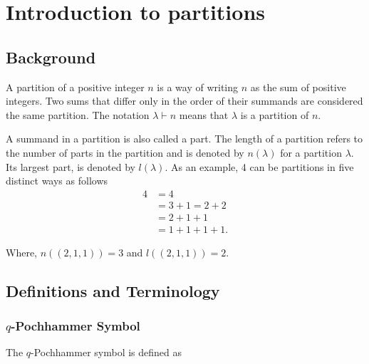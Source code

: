 \chapter{Introduction to partitions}



\section{Background}

A partition of a positive integer $n$ is a way of writing $n$ as the sum of positive integers. Two sums that differ only in the order of their summands are considered the same partition. The notation $\lambda \vdash n$ means that $\lambda$ is a partition of $n$. 

A summand in a partition is also called a part. The length of a partition refers to the number of parts in the partition and is denoted by $n(\lambda)$ for a partition $\lambda$. Its largest part, is denoted by $l(\lambda)$. As an example, 4 can be partitions in five distinct ways as follows
\begin{align*}
4 &= 4
  \\&= 3 + 1 = 2 + 2 
  \\&= 2 + 1 + 1 
  \\&= 1 + 1 + 1 + 1.
\end{align*}

Where, $n((2,1,1)) = 3$ and $l((2,1,1)) = 2$.
\newpage

\section{Definitions and Terminology}
\subsection{$q$-Pochhammer Symbol}

The $q$-Pochhammer symbol is defined as

